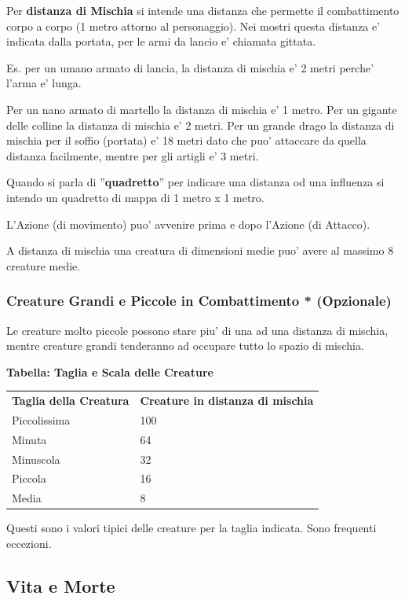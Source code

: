 \documentclass[a4paper,11pt,twoside,openany]{book}
\begin{document}
Per \textbf{distanza di Mischia}  si intende una distanza che permette il combattimento corpo a corpo (1 metro attorno al personaggio). Nei mostri questa distanza e' indicata dalla portata, per le armi da lancio e' chiamata gittata.

Es. per un umano armato di lancia, la distanza di mischia e' 2 metri perche' l'arma e' lunga.

Per un nano armato di martello la distanza di mischia e' 1 metro. Per un gigante delle colline la distanza di mischia e' 2 metri. Per un grande drago la distanza di mischia per il soffio (portata) e' 18 metri dato che puo' attaccare da quella distanza facilmente, mentre per gli artigli e' 3 metri.

Quando si parla di ''\textbf{quadretto}'' per indicare una distanza od una influenza si intendo un quadretto di mappa di 1 metro x 1 metro.

L'Azione (di movimento) puo' avvenire prima e dopo l'Azione (di Attacco).

A distanza di mischia una creatura di dimensioni medie puo' avere al massimo 8 creature medie.


\subsubsection{Creature Grandi e Piccole in Combattimento {*} (Opzionale)}

\label{creature-grandi-e-piccole-in-combattimento-opzionale}

Le creature molto piccole possono stare piu' di una ad una distanza
di mischia, mentre creature grandi tenderanno ad occupare tutto lo
spazio di mischia.
\medskip

\textbf{Tabella: Taglia e Scala delle Creature}

\medskip
\begin{tabular}{ll}
	\toprule 
	\textbf{Taglia della Creatura} & \textbf{Creature in distanza di mischia}\tabularnewline
	Piccolissima & 100\tabularnewline
	Minuta & 64\tabularnewline
	Minuscola & 32\tabularnewline
	Piccola & 16\tabularnewline
	Media & 8\tabularnewline	
\end{tabular}

\smallskip
Questi sono i valori tipici delle creature per la taglia indicata.
Sono frequenti eccezioni.
\bigskip

\pagebreak

\subsection{Vita e Morte}
\end{document}
